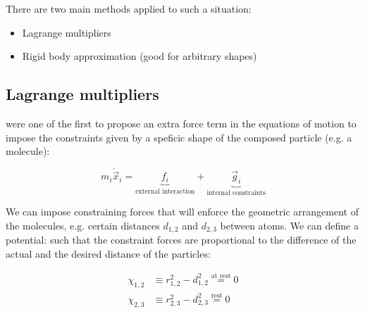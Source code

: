 There are two main methods applied to such a situation:
\begin{itemize}
\item Lagrange multipliers 
\item Rigid body approximation (good for arbitrary shapes)
\end{itemize}



\subsection{Lagrange multipliers}

\citet{lagrange} were one of the first to propose an extra force term in the equations of motion to impose the constraints given by a speficic shape of the composed particle (e.g. a molecule):

\begin{equation}
m_i\ddot{\vec{x}}_i = \underbrace{f_i}_{\text{external interaction}} + \underbrace{\vec{g}_i}_{\text{internal constraints}}
\end{equation}

We can impose constraining forces that will enforce the geometric arrangement of the molecules, e.g. certain distances $d_{1,2}$ and $d_{2,3}$ between atoms. We can define a potential: such that the constraint forces are proportional to the difference of the actual and the desired distance of the particles:

\begin{align}
\chi_{1,2} &\equiv r^2_{1,2} -d^2_{1,2} \overset{\text{at rest}}{=} 0 \label{eq:chi1}\\
\chi_{2,3} &\equiv r^2_{2,3} -d^2_{2,3} \overset{\text{rest}}{=} 0 \label{eq:chi2}
\end{align}

